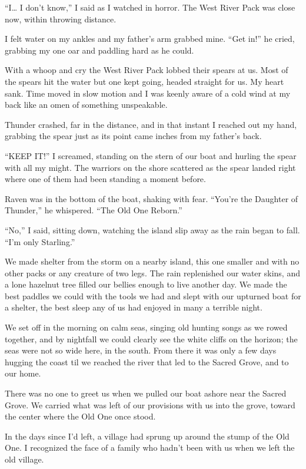 ``I\ldots{} I don't know,'' I said as I watched in horror. The West River Pack was close now, within throwing distance.

I felt water on my ankles and my father's arm grabbed mine. ``Get in!'' he cried, grabbing my one oar and paddling hard as he could.

With a whoop and cry the West River Pack lobbed their spears at us. Most of the spears hit the water but one kept going, headed straight for us. My heart sank. Time moved in slow motion and I was keenly aware of a cold wind at my back like an omen of something unspeakable.

Thunder crashed, far in the distance, and in that instant I reached out my hand, grabbing the spear just as its point came inches from my father's back.

``KEEP IT!'' I screamed, standing on the stern of our boat and hurling the spear with all my might. The warriors on the shore scattered as the spear landed right where one of them had been standing a moment before.

Raven was in the bottom of the boat, shaking with fear. ``You're the Daughter of Thunder,'' he whispered. ``The Old One Reborn.''

``No,'' I said, sitting down, watching the island slip away as the rain began to fall. ``I'm only Starling.''

\secdiv

We made shelter from the storm on a nearby island, this one smaller and with no other packs or any creature of two legs. The rain replenished our water skins, and a lone hazelnut tree filled our bellies enough to live another day. We made the best paddles we could with the tools we had and slept with our upturned boat for a shelter, the best sleep any of us had enjoyed in many a terrible night.

We set off in the morning on calm seas, singing old hunting songs as we rowed together, and by nightfall we could clearly see the white cliffs on the horizon; the seas were not so wide here, in the south. From there it was only a few days hugging the coast til we reached the river that led to the Sacred Grove, and to our home.

There was no one to greet us when we pulled our boat ashore near the Sacred Grove. We carried what was left of our provisions with us into the grove, toward the center where the Old One once stood.

In the days since I'd left, a village had sprung up around the stump of the Old One. I recognized the face of a family who hadn't been with us when we left the old village.


